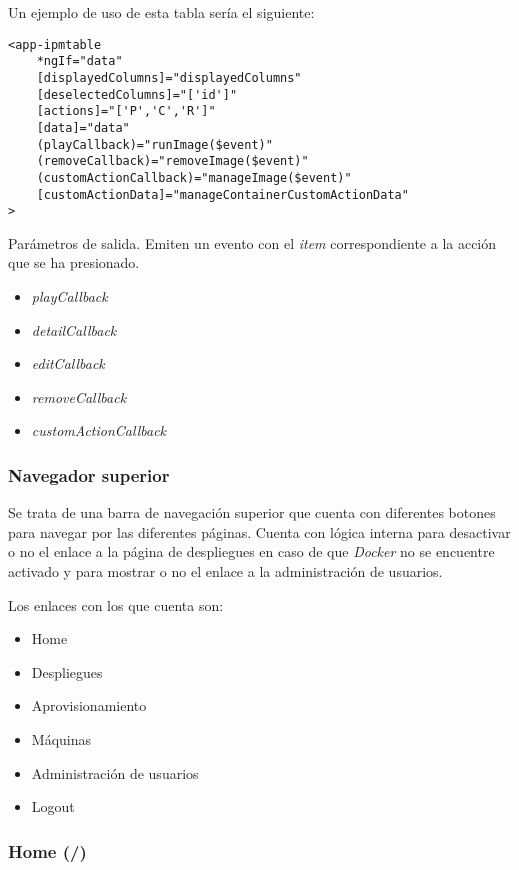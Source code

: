 Un ejemplo de uso de esta tabla sería el siguiente:

\begin{lstlisting}
<app-ipmtable
	*ngIf="data"
	[displayedColumns]="displayedColumns"
	[deselectedColumns]="['id']"
	[actions]="['P','C','R']"
	[data]="data"
	(playCallback)="runImage($event)"
	(removeCallback)="removeImage($event)"
	(customActionCallback)="manageImage($event)"
	[customActionData]="manageContainerCustomActionData"
>
\end{lstlisting}



\bigskip
Parámetros de salida. Emiten un evento con el \textit{item} correspondiente a la acción que se ha presionado.
\begin{itemize}
	\item \textit{playCallback}
	\item \textit{detailCallback}
	\item \textit{editCallback}
	\item \textit{removeCallback}
	\item \textit{customActionCallback}
\end{itemize}



\subsubsection{Navegador superior}

Se trata de una barra de navegación superior que cuenta con diferentes botones para navegar por las diferentes páginas. Cuenta con lógica interna para desactivar o no el enlace a la página de despliegues en caso de que \textit{Docker} no se encuentre activado y para mostrar o no el enlace a la administración de usuarios.

\bigskip
Los enlaces con los que cuenta son:
\begin{itemize}
	\item Home
	\item Despliegues
	\item Aprovisionamiento
	\item Máquinas
	\item Administración de usuarios
	\item Logout
\end{itemize}



\subsubsection{Home (/)}

